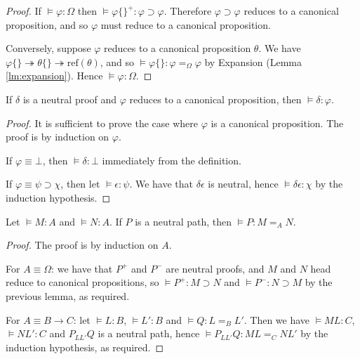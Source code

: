 \documentclass[a4paper,UKenglish]{lipics-v2016}
\newcommand*{\reff}[1]{\ensuremath{\mathrm{ref} \left( {#1} \right)}}
\theoremstyle{plain}
\theoremstyle{definition}
\begin{document}
\begin{proof}
If $\models \varphi : \Omega$ then $\models \varphi \{\}^+ : \varphi \supset \varphi$.  Therefore $\varphi \supset \varphi$ reduces to a canonical proposition,
and so $\varphi$ must reduce to a canonical proposition.

Conversely, suppose $\varphi$ reduces to a canonical proposition $\theta$.  We have $\varphi \{\} \twoheadrightarrow \theta \{\} \twoheadrightarrow \reff{\theta}$, and so $\models \varphi \{\} : \varphi =_\Omega \varphi$ by Expansion (Lemma \ref{lm:expansion}).  Hence $\models \varphi : \Omega$.
\end{proof}

\begin{lemma}
\label{lm:neutral-proof}
If $\delta$ is a neutral proof and $\varphi$ reduces to a canonical proposition, then $\models \delta : \varphi$.
\end{lemma}

\begin{proof}
It is sufficient to prove the case where $\varphi$ is a canonical proposition.  The proof is by induction on $\varphi$.

If $\varphi \equiv \bot$, then $\models \delta : \bot$ immediately from the definition.

If $\varphi \equiv \psi \supset \chi$, then let $\models \epsilon : \psi$.  We have that $\delta \epsilon$ is neutral,
hence $\models \delta \epsilon : \chi$ by the induction hypothesis.
\end{proof}

\begin{lemma}
\label{lm:neutral-path}
Let $\models M : A$ and $\models N : A$.  If $P$ is a neutral path, then $\models P : M =_A N$.
\end{lemma}

\begin{proof}
The proof is by induction on $A$.

For $A \equiv \Omega$: we have that $P^+$ and $P^-$ are neutral proofs, and $M$ and $N$ head reduce to canonical propositions, so $\models P^+ : M \supset N$ and
$\models P^- : N \supset M$ by the previous lemma, as required.

For $A \equiv B \rightarrow C$: let $\models L : B$, $\models L' : B$ and $\models Q : L =_B L'$.  Then we have $\models ML : C$, $\models NL' : C$ and
$P_{LL'} Q$ is a neutral path, hence $\models P_{L L'} Q : ML =_C NL'$ by the induction hypothesis, as required.
\end{proof}
\end{document}
